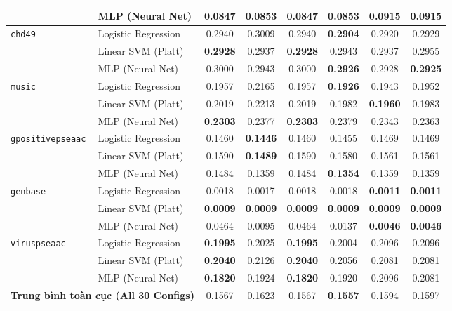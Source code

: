 \documentclass[10pt,a4paper,twoside]{article}
\begin{document}
\begin{table}[H]
{\begin{tabular}{llcccccc}
 & MLP (Neural Net) & \textbf{0.0847} & 0.0853 & \textbf{0.0847} & 0.0853 & 0.0915 & 0.0915 \\
\midrule
\multirow{3}{*}{\texttt{chd49}} & Logistic Regression & 0.2940 & 0.3009 & 0.2940 & \textbf{0.2904} & 0.2920 & 0.2929 \\
 & Linear SVM (Platt) & \textbf{0.2928} & 0.2937 & \textbf{0.2928} & 0.2943 & 0.2937 & 0.2955 \\
 & MLP (Neural Net) & 0.3000 & 0.2943 & 0.3000 & \textbf{0.2926} & 0.2928 & \textbf{0.2925} \\
\midrule
\multirow{3}{*}{\texttt{music}} & Logistic Regression & 0.1957 & 0.2165 & 0.1957 & \textbf{0.1926} & 0.1943 & 0.1952 \\
 & Linear SVM (Platt) & 0.2019 & 0.2213 & 0.2019 & 0.1982 & \textbf{0.1960} & 0.1983 \\
 & MLP (Neural Net) & \textbf{0.2303} & 0.2377 & \textbf{0.2303} & 0.2379 & 0.2343 & 0.2363 \\
\midrule
\multirow{3}{*}{\texttt{gpositivepseaac}} & Logistic Regression & 0.1460 & \textbf{0.1446} & 0.1460 & 0.1455 & 0.1469 & 0.1469 \\
 & Linear SVM (Platt) & 0.1590 & \textbf{0.1489} & 0.1590 & 0.1580 & 0.1561 & 0.1561 \\
 & MLP (Neural Net) & 0.1484 & 0.1359 & 0.1484 & \textbf{0.1354} & 0.1359 & 0.1359 \\
\midrule
\multirow{3}{*}{\texttt{genbase}} & Logistic Regression & 0.0018 & 0.0017 & 0.0018 & 0.0018 & \textbf{0.0011} & \textbf{0.0011} \\
 & Linear SVM (Platt) & \textbf{0.0009} & \textbf{0.0009} & \textbf{0.0009} & \textbf{0.0009} & \textbf{0.0009} & \textbf{0.0009} \\
 & MLP (Neural Net) & 0.0464 & 0.0095 & 0.0464 & 0.0137 & \textbf{0.0046} & \textbf{0.0046} \\
\midrule
\multirow{3}{*}{\texttt{viruspseaac}} & Logistic Regression & \textbf{0.1995} & 0.2025 & \textbf{0.1995} & 0.2004 & 0.2096 & 0.2096 \\
 & Linear SVM (Platt) & \textbf{0.2040} & 0.2126 & \textbf{0.2040} & 0.2056 & 0.2081 & 0.2081 \\
 & MLP (Neural Net) & \textbf{0.1820} & 0.1924 & \textbf{0.1820} & 0.1920 & 0.2096 & 0.2081 \\
\midrule
\multicolumn{2}{l}{\textbf{Trung bình toàn cục (All 30 Configs)}} & 0.1567 & 0.1623 & 0.1567 & \textbf{0.1557} & 0.1594 & 0.1597 \\
\bottomrule
\end{tabular}%
}
\end{table}
\clearpage
\end{document}
